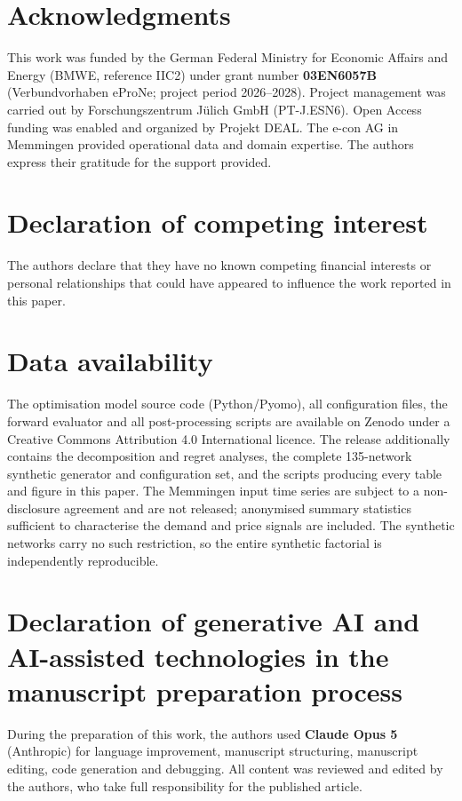 
\section*{Acknowledgments}

This work was funded by the German Federal Ministry for Economic Affairs and Energy
(BMWE, reference IIC2) under grant number \textbf{03EN6057B} (Verbundvorhaben eProNe;
project period 2026--2028). Project management was carried out by Forschungszentrum
J\"ulich GmbH (PT-J.ESN6). Open Access funding was enabled and organized by Projekt DEAL.
The e-con AG in Memmingen provided operational data and domain expertise. The authors
express their gratitude for the support provided.

\section*{Declaration of competing interest}


The authors declare that they have no known competing financial interests or personal
relationships that could have appeared to influence the work reported in this paper.

\section*{Data availability}

The optimisation model source code (Python/Pyomo), all configuration files, the forward
evaluator and all post-processing scripts are available on Zenodo
\citep{ruess_2026_calion} under a Creative Commons Attribution 4.0 International licence.
The release additionally contains the decomposition and regret
analyses, the complete 135-network synthetic generator and configuration set, and the
scripts producing every table and figure in this paper. The Memmingen input time series
are subject to a non-disclosure agreement and are not released; anonymised summary
statistics sufficient to characterise the demand and price signals are included. The
synthetic networks carry no such restriction, so the entire synthetic factorial is
independently reproducible.

\section*{Declaration of generative AI and AI-assisted technologies in the manuscript
preparation process}

During the preparation of this work, the authors used \textbf{Claude Opus 5} (Anthropic)
for language improvement, manuscript structuring, manuscript editing, code generation and debugging. All content was reviewed and edited by the authors, who take full responsibility for the published article.
